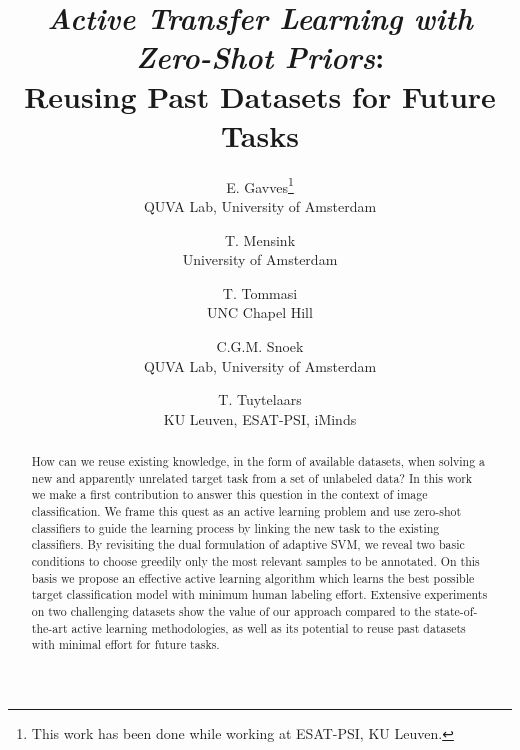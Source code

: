 \documentclass[10pt,twocolumn,letterpaper]{article}
\begin{document}
\title{\emph{Active Transfer Learning with Zero-Shot Priors}:\\ Reusing Past Datasets for Future Tasks}

\author{E. Gavves\thanks{This work has been done while working at ESAT-PSI, KU Leuven.}\\
QUVA Lab, University of Amsterdam\\
%
\and
T. Mensink\\
University of Amsterdam\\
%
\and
T. Tommasi\footnotemark[1]\\
UNC Chapel Hill\\
%
\and
C.G.M. Snoek\\
QUVA Lab, University of Amsterdam\\
%
\and
T. Tuytelaars\\
KU Leuven, ESAT-PSI, iMinds\\
}

\maketitle


\begin{abstract}
How can we reuse existing knowledge, in the form of available  datasets, when solving a new and apparently unrelated target task from a set of unlabeled data? 
In this work we make a first contribution to answer this question in the context of image classification. 
We frame this quest as an active learning problem and use zero-shot 
classifiers to guide the learning process by linking the new task to the
existing classifiers.
By revisiting the dual formulation of adaptive SVM, we reveal two basic conditions to choose greedily only the most relevant samples to be annotated. 
On this basis we propose an effective active learning algorithm which learns the best possible target classification model with minimum human labeling effort. 
Extensive experiments on two challenging datasets show the value of our approach compared to the state-of-the-art active learning methodologies, as well as its potential to reuse past datasets with minimal effort for future tasks.
\end{abstract}
\end{document}
